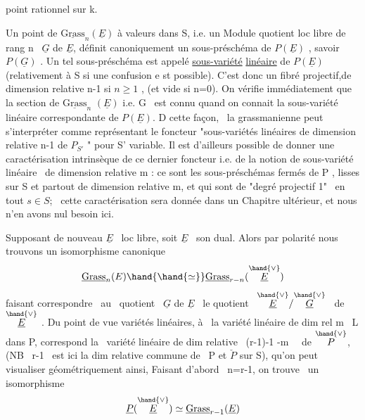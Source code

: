 
point rationnel sur k.

Un point de $\underline{\mathrm{Grass}}_n(\underline{E})$ à valeurs dans S, i.e. un Module quotient
loc libre de rang n \ $\underline{G}$ de $\underline{E}$, définit canoniquement un sous-préschéma
de $P(\underline{E})$ , savoir $P(\underline{G})$ . Un tel sous-préschéma est appelé \uline{sous-variété}
\uline{linéaire} de $P(\underline{E})$ (relativement à S si une confusion e st possible).
C'est donc un fibré projectif,de dimension relative n-1 si $n\geqslant 1$ ,
(et vide si n=0). On vérifie immédiatement que la section de $\underline{\mathrm{Grass}}_n$
$(\underline{E})$ i.e. G \ est connu quand on connait la sous-variété linéaire
correspondante de $P(\underline{E})$. D cette façon, \ la grassmanienne peut
s'interpréter comme représentant le foncteur "sous-variétés linéaires
de dimension relative n-1  de $P_{S'}$ " pour S'
variable. Il est d'ailleurs possible de donner une caractérisation
intrinsèque de ce dernier foncteur i.e. de la notion de sous-variété
linéaire \ de dimension relative m : ce sont les sous-préschémas fermés
de P , lisses sur S et partout de dimension relative m, et qui sont
de "degré projectif 1" \ en tout $s\in S$; \ cette caractérisation sera
donnée dans un Chapitre ultérieur, et nous n'en avons nul besoin ici.

Supposant de nouveau $\underline{E}$ \ loc libre, soit $\underline{E}$ \ son dual. Alors
par polarité nous trouvons un isomorphisme canonique
\[ \underline{\mathrm{Grass}}_n(E) \hand{\hand{\simeq}} \underline{\mathrm{Grass}}_{r-n}(\overset{\hand{\vee}}{\underline{E}}) \]
faisant correspondre \ au \ quotient \ $\underline{G}$ de $\underline{E}$ \ le quotient \ $\overset{\hand{\vee}}{\underline{E}}/\overset{\hand{\vee}}{\underline{G}}$ \ de $\overset{\hand{\vee}}{\underline{E}}$ .
Du point de vue variétés linéaires, à \ la variété linéaire de dim rel
m \ L dans P, correspond la \ variété linéaire de dim relative
 \ (r-1)-1 -m \ \ de $\overset{\hand{\vee}}{P}$, (NB \ r-1 \ est ici la dim relative
commune de \ P et $\check{P}$ sur S), qu'on peut visualiser géométriquement ainsi,
Faisant d'abord \ n=r-1, on trouve \ un isomorphisme
\[ \underline{P}(\overset{\hand{\vee}}{\underline{E}}) \simeq \underline{\mathrm{Grass}}_{r-1}(\underline{E}) \]

